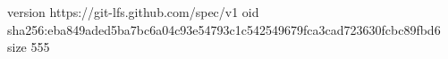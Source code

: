 version https://git-lfs.github.com/spec/v1
oid sha256:eba849aded5ba7bc6a04c93e54793c1c542549679fca3cad723630fcbc89fbd6
size 555
